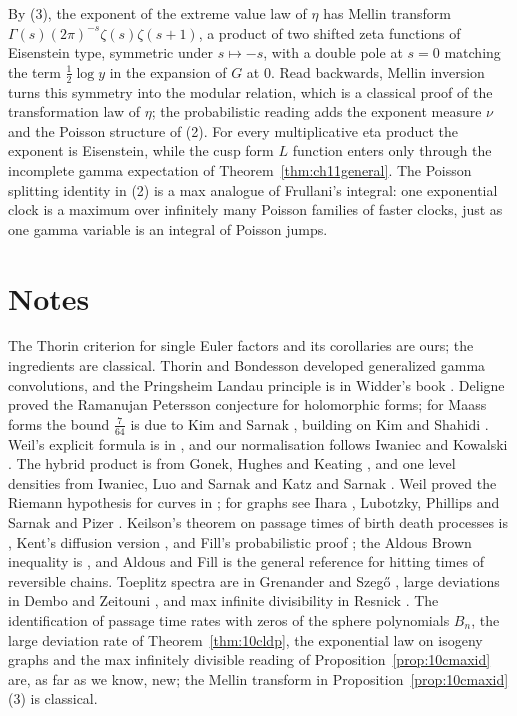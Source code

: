 By (3), the exponent of the extreme value law of $\eta$ has Mellin transform $\Gamma(s)(2\pi)^{-s}\zeta(s)\zeta(s+1)$, a product of two shifted zeta functions of Eisenstein type, symmetric under $s\mapsto-s$, with a double pole at $s=0$ matching the term $\frac12\log y$ in the expansion of $G$ at $0$. Read backwards, Mellin inversion turns this symmetry into the modular relation, which is a classical proof of the transformation law of $\eta$; the probabilistic reading adds the exponent measure $\nu$ and the Poisson structure of (2). For every multiplicative eta product the exponent is Eisenstein, while the cusp form $L$ function enters only through the incomplete gamma expectation of Theorem~\ref{thm:ch11general}. The Poisson splitting identity in (2) is a max analogue of Frullani's integral: one exponential clock is a maximum over infinitely many Poisson families of faster clocks, just as one gamma variable is an integral of Poisson jumps.

\section{Notes}

The Thorin criterion for single Euler factors and its corollaries are ours; the ingredients are classical. Thorin \cite{thorin1977} and Bondesson \cite{bondesson1992} developed generalized gamma convolutions, and the Pringsheim Landau principle is in Widder's book \cite{widder1941}. Deligne \cite{deligne1974} proved the Ramanujan Petersson conjecture for holomorphic forms; for Maass forms the bound $\frac{7}{64}$ is due to Kim and Sarnak \cite{kimsarnak2003}, building on Kim and Shahidi \cite{kimshahidi2002}. Weil's explicit formula is in \cite{weil1952}, and our normalisation follows Iwaniec and Kowalski \cite{iwanieckowalski2004}. The hybrid product is from Gonek, Hughes and Keating \cite{ghk2007}, and one level densities from Iwaniec, Luo and Sarnak \cite{ils2000} and Katz and Sarnak \cite{katzsarnak1999}. Weil proved the Riemann hypothesis for curves in \cite{weil1948}; for graphs see Ihara \cite{ihara1966}, Lubotzky, Phillips and Sarnak \cite{lps1988} and Pizer \cite{pizer1990}. Keilson's theorem on passage times of birth death processes is \cite{keilson1971}, Kent's diffusion version \cite{kent1980}, and Fill's probabilistic proof \cite{fill2009}; the Aldous Brown inequality is \cite{aldousbrown1992}, and Aldous and Fill \cite{aldousfill} is the general reference for hitting times of reversible chains. Toeplitz spectra are in Grenander and Szeg\H{o} \cite{grenandersz}, large deviations in Dembo and Zeitouni \cite{dembozeitouni1998}, and max infinite divisibility in Resnick \cite{resnick1987}. The identification of passage time rates with zeros of the sphere polynomials $B_n$, the large deviation rate of Theorem~\ref{thm:10cldp}, the exponential law on isogeny graphs and the max infinitely divisible reading of Proposition~\ref{prop:10cmaxid} are, as far as we know, new; the Mellin transform in Proposition~\ref{prop:10cmaxid}(3) is classical.

